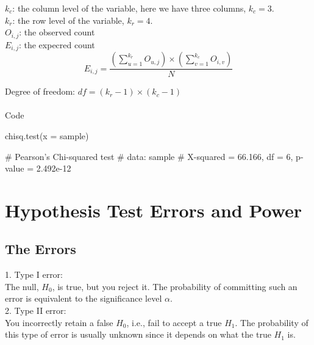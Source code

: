 \documentclass[12pt]{article}
\begin{document}
$ k_{c} $: the column level of the variable, here
we have three columns, $ k_{c} = 3 $.\\
$ k_{r} $: the row level of the variable, $ k_{r} = 4 $.\\
$ O_{i,j} $: the observed count\\
$ E_{i,j} $: the expecred count
\begin{equation*}
E_{i,j} = \frac{
		\left( 
				\sum\limits_{u = 1} ^{k_{r}} O_{u,j}	 
		\right)  \times 
		\left( 
				\sum\limits_{v = 1} ^{k_{c}} O_{i,v}
		\right) 
}
{N}
\end{equation*}

Degree of freedom: $ df = (k_{r} - 1) \times (k_{c} - 1) $\\


\noindent{}\\

Code
\begin{rc}
chisq.test(x = sample)

#	        Pearson's Chi-squared test
#	data:  sample
#	X-squared = 66.166, df = 6, p-value = 2.492e-12
\end{rc}







\section{Hypothesis Test Errors and Power}

\subsection{The Errors}

1. Type I error:\\
The null, $ H_0 $, is true, but you reject it. The probability of 
committing such an error is equivalent to the significance level 
$ \alpha $.\\

2. Type II error:\\
You incorrectly retain a false $ H_0 $, i.e., fail to accept a true
$ H_1 $. The probability of this type of error is usually unknown since
it depends on what the true $ H_1 $ is.
\end{document}
